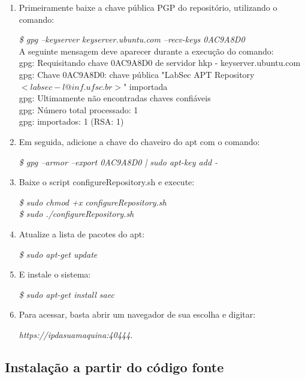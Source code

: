 \begin{enumerate}
  \item Primeiramente baixe a chave pública PGP do repositório, utilizando o comando:  
  
    \textit{\$ gpg --keyserver keyserver.ubuntu.com --recv-keys 0AC9A8D0} \\
    
    A seguinte mensagem deve aparecer durante a execução do comando:\\
    gpg: Requisitando chave 0AC9A8D0 de servidor hkp - keyserver.ubuntu.com\\
    gpg: Chave 0AC9A8D0: chave pública "LabSec APT Repository $<labsec-l@inf.ufsc.br>$" importada\\
    gpg: Ultimamente não encontradas chaves confiáveis\\
    gpg: Número total processado: 1\\
    gpg:              importados: 1  (RSA: 1)
    
  \item Em seguida, adicione a chave do chaveiro do apt com o comando:  
  
  \textit{\$ gpg --armor --export 0AC9A8D0 | sudo apt-key add -}
  
  \item Baixe o script configureRepository.sh e execute:  
  
  \textit{\$ sudo chmod +x configureRepository.sh}\\
 \textit{\$ sudo ./configureRepository.sh}
  
  \item Atualize a lista de pacotes do apt:  
  
  \textit{\$ sudo apt-get update}
  
  \item E instale o sistema:  
  
  \textit{\$ sudo apt-get install saec}
  
  \item Para acessar, basta abrir um navegador de sua escolha e digitar: 
  
  \textit{https://ipdasuamaquina:40444}.
\end{enumerate}

\subsection{Instalação a partir do código fonte}

